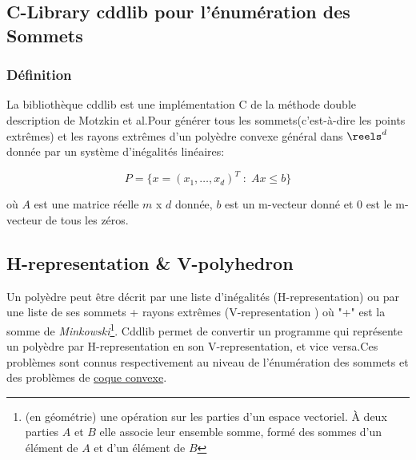 \subsection{C-Library cddlib pour l'énumération des Sommets}
\subsubsection{Définition}

La bibliothèque cddlib est une implémentation C de la méthode double description de Motzkin et al.Pour générer tous les sommets(c’est-à-dire les points extrêmes) et les rayons extrêmes d’un polyèdre convexe général dans $ \reels^{d}$ donnée par un système d’inégalités linéaires:  

\begin{equation}
     P= \{ x=({x}_{1}, \ldots, {x}_{d})^{T}  \;: \;Ax \leq b  \}     
\end{equation}

% 
% 
où $A$ est une matrice réelle $m$ x $d$ donnée, $b$ est un m-vecteur donné et 0 est le m-vecteur de tous les zéros.


\subsection{ H-representation \& V-polyhedron}

Un polyèdre peut être décrit par une liste d'inégalités (H-representation) ou par une liste de ses sommets + rayons extrêmes (V-representation ) où "+" est la somme de \textit{Minkowski}\footnote{(en géométrie) une opération sur les parties d'un espace vectoriel. À deux parties $A$ et $B$ elle associe leur ensemble somme, formé des sommes d'un élément de $A$ et d'un élément de $B$}. Cddlib\cite{cdd/cddplus} permet de convertir un programme qui représente un polyèdre par H-representation en son V-representation, et vice versa.Ces problèmes sont connus respectivement au niveau de l’énumération des sommets et des problèmes de \href{http://le-terrier-de-lapineige.over-blog.com/2014/09/bm-c-comme-convex-hull-un-outil-de-modelisation-polyvalent.html}{coque convexe}.
\newpage
